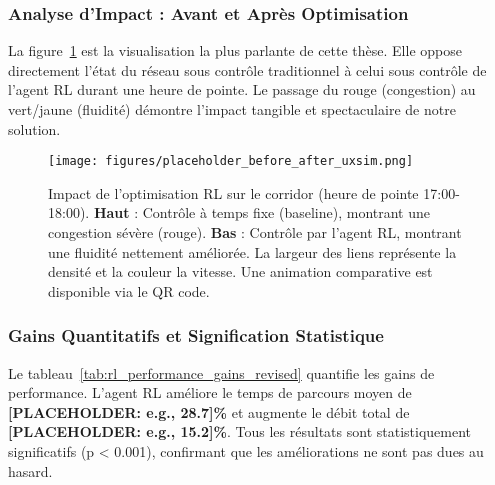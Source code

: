 \subsubsection{Analyse d'Impact : Avant et Après Optimisation}
\label{subsec:impact_rl}

La figure~\ref{fig:before_after_ultimate_revised} est la visualisation la plus parlante de cette thèse. Elle oppose directement l'état du réseau sous contrôle traditionnel à celui sous contrôle de l'agent RL durant une heure de pointe. Le passage du rouge (congestion) au vert/jaune (fluidité) démontre l'impact tangible et spectaculaire de notre solution.

\begin{figure}[p]
    \centering
    \texttt{[image: figures/placeholder\_before\_after\_uxsim.png]}
    \caption{Impact de l'optimisation RL sur le corridor (heure de pointe 17:00-18:00). \textbf{Haut} : Contrôle à temps fixe (baseline), montrant une congestion sévère (rouge). \textbf{Bas} : Contrôle par l'agent RL, montrant une fluidité nettement améliorée. La largeur des liens représente la densité et la couleur la vitesse. Une animation comparative est disponible via le QR code.}
    \label{fig:before_after_ultimate_revised}
\end{figure}

\subsubsection{Gains Quantitatifs et Signification Statistique}
\label{subsec:gains_quantitatifs_rl}

Le tableau~\ref{tab:rl_performance_gains_revised} quantifie les gains de performance. L'agent RL améliore le temps de parcours moyen de \textbf{[PLACEHOLDER: e.g., 28.7]\%} et augmente le débit total de \textbf{[PLACEHOLDER: e.g., 15.2]\%}. Tous les résultats sont statistiquement significatifs (p < 0.001), confirmant que les améliorations ne sont pas dues au hasard.

